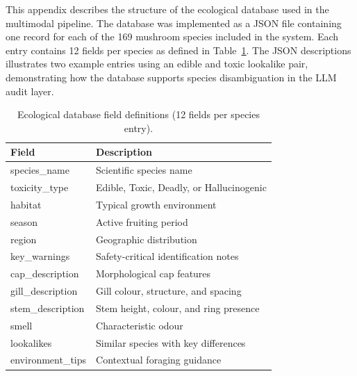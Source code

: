 \documentclass[journal,transmag]{IEEEtran}
\begin{document}
This appendix describes the structure of the ecological database used in the multimodal pipeline. The database was implemented as a JSON file containing one record for each of the 169 mushroom species included in the system. Each entry contains 12 fields per species as defined 
in Table~\ref{tab:eco-schema}. The JSON descriptions
illustrates two example entries using an edible and toxic 
lookalike pair, demonstrating how the database supports 
species disambiguation in the LLM audit layer.

\begin{table}[h]
\centering
\normalsize
\caption{Ecological database field definitions (12 fields per species entry).}
\label{tab:eco-schema}
\begin{tabular}{ll}
\hline
\textbf{Field} & \textbf{Description} \\
\hline
species\_name     & Scientific species name \\
toxicity\_type    & Edible, Toxic, Deadly, or Hallucinogenic \\
habitat           & Typical growth environment \\
season            & Active fruiting period \\
region            & Geographic distribution \\
key\_warnings     & Safety-critical identification notes \\
cap\_description  & Morphological cap features \\
gill\_description & Gill colour, structure, and spacing \\
stem\_description & Stem height, colour, and ring presence \\
smell             & Characteristic odour \\
lookalikes        & Similar species with key differences \\
environment\_tips & Contextual foraging guidance \\
\hline
\end{tabular}
\end{table}
\end{document}
